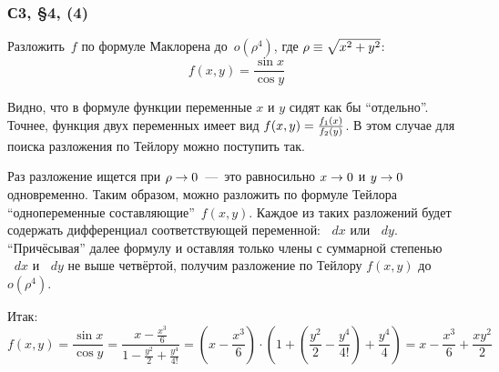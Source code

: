 \documentclass[a4paper,12pt]{article}
\newcommand{\diff}{\mathop{}\!d}
\begin{document}
  \subsubsection{С3, \S 4, (4)}

  Разложить~$f$ по формуле Маклорена до~$o(\rho^4)$, где $\rho \hm\equiv \sqrt{x^2 + y^2}$:
  \[
    f(x, y) = \frac{\sin x}{\cos y}
  \]
  
  \begin{solution}
    Видно, что в формуле функции переменные $x$ и $y$ сидят как бы ``отдельно''.
    Точнее, функция двух переменных имеет вид $f(x, y) \hm= \frac{f_1(x)}{f_2(y)}$.
    В этом случае для поиска разложения по Тейлору можно поступить так.

    Раз разложение ищется при $\rho \hm\to 0$~---~это равносильно $x \hm\to 0$ и $y \hm\to 0$ одновременно.
    Таким образом, можно разложить по формуле Тейлора ``однопеременные составляющие''~$f(x, y)$.
    Каждое из таких разложений будет содержать дифференциал соответствующей переменной: $\diff x$ или $\diff y$.
    ``Причёсывая'' далее формулу и оставляя только члены с суммарной степенью $\diff x$ и $\diff y$ не выше четвёртой, получим разложение по Тейлору $f(x, y)$ до $o(\rho^4)$.

    Итак:
    \[
      f(x, y) = \frac{\sin x}{\cos y}
       = \frac{x - \frac{x^3}{6}}{1 - \frac{y^2}{2} + \frac{y^4}{4!}} = \left(x - \frac{x^3}{6}\right) \cdot \left(1 + \left(\frac{y^2}{2} - \frac{y^4}{4!}\right) + \frac{y^4}{4}\right)
       = x - \frac{x^3}{6} + \frac{xy^2}{2}
    \]
  \end{solution}
\end{document}
